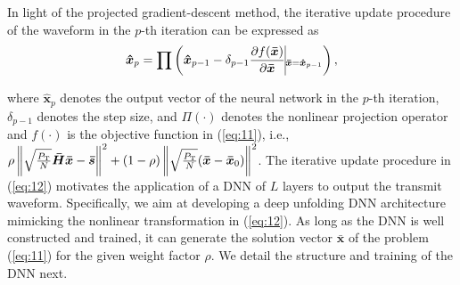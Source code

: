 \documentclass[conference]{IEEEtran}
\begin{document}
In light of the projected gradient-descent method, the iterative update procedure of the waveform in the $p$-th iteration can be expressed as
\begin{equation}
\boldsymbol{\hat{x}}_{p} =\prod \left(\boldsymbol{\hat{x}}_{p-1} - \delta_{p-1} \frac{\partial f(\boldsymbol{\bar{x}})}{\partial \boldsymbol{\bar{x}}} \vline_{\boldsymbol{\bar{x}} = \boldsymbol{\hat{x}}_{p-1}}\right), \label{eq:12} %
\end{equation}   

where $\boldsymbol{\hat{x}}_{p}$ denotes the output vector of the neural network in the $p$-th iteration, $ \delta_{p-1} $ denotes the step size, and $ \Pi (\cdot) $ denotes the nonlinear projection operator and  $f(\cdot)$ is the objective function in (\ref{eq:11}), i.e., $ \rho\left\lVert\sqrt{\frac{P_{\textrm{T}}}{N}}\boldsymbol{\bar{H}\bar{x}}-\boldsymbol{\bar{s}}\right\rVert^{2} + (1 - \rho)\left\lVert\sqrt{\frac{P_{\textrm{T}}}{N}}(\boldsymbol{\bar{x}} - \boldsymbol{\bar{x}}_{0})\right\rVert^{2} $. %
The iterative update procedure in (\ref{eq:12}) motivates the application of a DNN of $ L $ layers to output the transmit waveform. Specifically, we aim at developing a deep unfolding DNN architecture mimicking the nonlinear transformation in (\ref{eq:12}). As long as the DNN is well constructed and trained, it can generate the solution vector $ \boldsymbol{\bar{x}} $ of the problem (\ref{eq:11}) for the given weight factor $ \rho $. %
We detail the structure and training of the DNN next.
%
\end{document}
